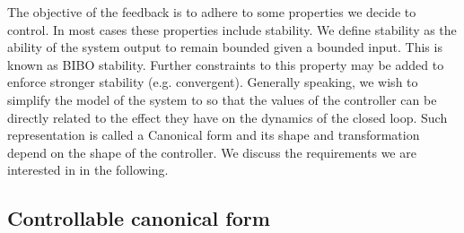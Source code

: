 \documentclass[sigconf]{llncs}
\begin{document}
The objective of the feedback is to adhere to some properties we decide to
control.  In most cases these properties include stability.  We define
stability as the ability of the system output to remain bounded given a
bounded input.  This is known as BIBO stability.  Further constraints to
this property may be added to enforce stronger stability (e.g.  convergent). 
Generally speaking, we wish to simplify the model of the system to so that
the values of the controller can be directly related to the effect they have
on the dynamics of the closed loop.  Such representation is called a
Canonical form and its shape and transformation depend on the shape of the
controller.  We discuss the requirements we are interested in in the
following.

\subsection{Controllable canonical form} \label{sec:reachable}
\end{document}
